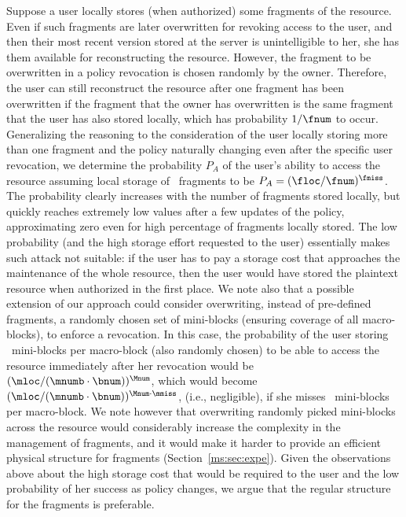 \medskip
{}
Suppose a user locally stores (when authorized) some fragments of the resource. Even if such fragments are later overwritten for revoking access to the user, and then their most recent version stored at the server is unintelligible to her, she has them available for reconstructing the resource. However, the fragment to be overwritten in a policy revocation is chosen randomly by the owner. Therefore, the user can still reconstruct the resource after one fragment has been overwritten if the fragment that the owner has overwritten is the same fragment that the user has also stored locally, which has probability ${1}/{\fnum}$ to occur. Generalizing the reasoning to the consideration of the user locally storing more than one fragment and the policy naturally changing even after the specific user revocation, we determine the probability $P_A$ of the user's ability to access the resource assuming local storage of \floc\ fragments to be $P_A=(\floc/\fnum)^{\fmiss}$. The probability clearly increases with the number of fragments stored locally, but quickly reaches extremely low values after a few updates of the policy, approximating zero even for high percentage of fragments locally stored. The low probability (and the high storage effort requested to the user) essentially makes such attack not suitable: if the user has to pay a storage cost that approaches the maintenance of the whole resource, then the user would have stored the plaintext resource when authorized in the first place. We note also that a possible extension of our approach could consider overwriting, instead of pre-defined fragments, a randomly chosen set of mini-blocks (ensuring coverage of all macro-blocks), to enforce a revocation. In this case, the probability of the user storing \mloc\ mini-blocks per macro-block (also randomly chosen) to be able to access the resource immediately after her revocation would be $(\mloc/(\mnumb\cdot\bnum))^{\Mnum}$, which would become $(\mloc/(\mnumb\cdot\bnum))^{\Mnum\cdot \mmiss}$, (i.e., negligible), if she misses \mmiss\ mini-blocks per macro-block. We note however that overwriting randomly picked mini-blocks across the resource would considerably increase the complexity in the management of fragments, and it would make it harder to provide an efficient physical structure for fragments (Section~\ref{ms:sec:expe}). Given the observations above about the high storage cost that would be required to the user and the low probability of her success as policy changes, we argue that the regular structure for the fragments is preferable.

